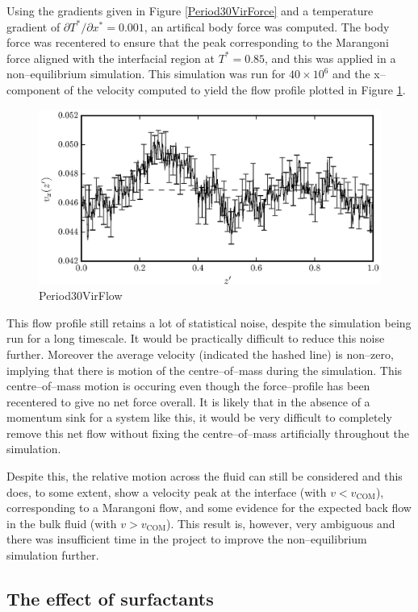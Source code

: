 Using the gradients given in Figure \ref{Period30VirForce} and a temperature gradient of $\partial T^{*} / \partial x^{*} = 0.001$, an artifical body force was computed.
The body force was recentered to ensure that the peak corresponding to the Marangoni force aligned with the interfacial region at $T^{*} = 0.85$, and this was applied in a non--equilibrium simulation.
This simulation was run for $40 \times 10^{6}$ and the x--component of the velocity computed to yield the flow profile plotted in Figure \ref{Period30VirFlow}.

\begin{figure}[h]
\centering
\includegraphics[scale=0.8]{Period30VirFlow}
\caption{Period30VirFlow}
\label{Period30VirFlow}
\end{figure}

This flow profile still retains a lot of statistical noise, despite the simulation being run for a long timescale.
It would be practically difficult to reduce this noise further.
Moreover the average velocity (indicated the hashed line) is non--zero, implying that there is motion of the centre--of--mass during the simulation.
This centre--of--mass motion is occuring even though the force--profile has been recentered to give no net force overall.
It is likely that in the absence of a momentum sink for a system like this, it would be very difficult to completely remove this net flow without fixing the centre--of--mass artificially throughout the simulation.

Despite this, the relative motion across the fluid can still be considered and this does, to some extent, show a velocity peak at the interface (with $v < v_{\mathrm{COM}}$), corresponding to a Marangoni flow, and some evidence for the expected back flow in the bulk fluid (with $v > v_{\mathrm{COM}}$).
This result is, however, very ambiguous and there was insufficient time in the project to improve the non--equilibrium simulation further.

\subsection{The effect of surfactants}



